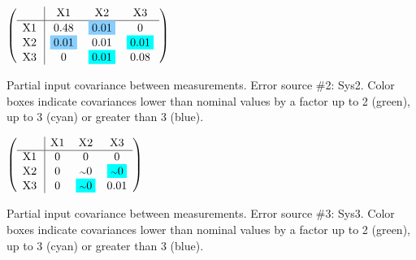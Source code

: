 \begin{table}[H]
\scriptsize
\begin{center}
\renewcommand{\arraystretch}{1.1}
\begin{math}\left(\begin{array}{c|ccc}
 & \mathrm{X1} & 
\mathrm{X2} & 
\mathrm{X3} \\
\hline
\mathrm{X1} \hspace*{2pt} &       0.48 &  \colorbox{SkyBlue1}{$      0.01$} &  0 \\
\mathrm{X2} \hspace*{2pt} &  \colorbox{SkyBlue1}{$      0.01$} &       0.01 &  \colorbox{Cyan1}{$      0.01$} \\
\mathrm{X3} \hspace*{2pt} &  0 &  \colorbox{Cyan1}{$      0.01$} &       0.08 \\
\end{array}\right)\end{math}
\caption{Partial input covariance between measurements. Error source \#2: Sys2. Color boxes indicate covariances lower than nominal values by a factor up to 2 (green), up to 3 (cyan) or greater than 3 (blue).}
\renewcommand{\arraystretch}{1}
\end{center}
\end{table}
\begin{table}[H]
\scriptsize
\begin{center}
\renewcommand{\arraystretch}{1.1}
\begin{math}\left(\begin{array}{c|ccc}
 & \mathrm{X1} & 
\mathrm{X2} & 
\mathrm{X3} \\
\hline
\mathrm{X1} \hspace*{2pt} &  0 &  0 &  0 \\
\mathrm{X2} \hspace*{2pt} &  0 &  {\scriptstyle \sim }0 &  \colorbox{Cyan1}{$ {\scriptstyle \sim }0$} \\
\mathrm{X3} \hspace*{2pt} &  0 &  \colorbox{Cyan1}{$ {\scriptstyle \sim }0$} &       0.01 \\
\end{array}\right)\end{math}
\caption{Partial input covariance between measurements. Error source \#3: Sys3. Color boxes indicate covariances lower than nominal values by a factor up to 2 (green), up to 3 (cyan) or greater than 3 (blue).}
\renewcommand{\arraystretch}{1}
\end{center}
\end{table}
\clearpage
